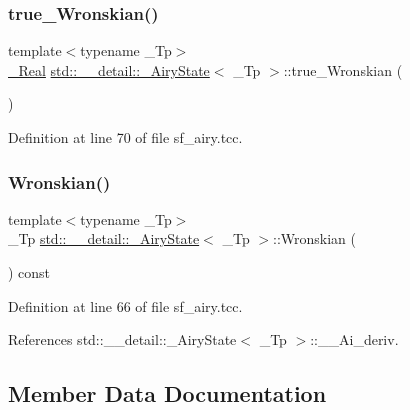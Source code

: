 \subsubsection{\texorpdfstring{true\+\_\+\+Wronskian()}{true\_Wronskian()}}
{\footnotesize\ttfamily template$<$typename \+\_\+\+Tp$>$ \\
\hyperlink{structstd_1_1____detail_1_1__AiryState_a8fc5c7c19e6dd8f25f1e4103f74c0a3b}{\+\_\+\+Real} \hyperlink{structstd_1_1____detail_1_1__AiryState}{std\+::\+\_\+\+\_\+detail\+::\+\_\+\+Airy\+State}$<$ \+\_\+\+Tp $>$\+::true\+\_\+\+Wronskian (\begin{DoxyParamCaption}{ }\end{DoxyParamCaption})\hspace{0.3cm}{\ttfamily [inline]}}



Definition at line 70 of file sf\+\_\+airy.\+tcc.

\mbox{\label{structstd_1_1____detail_1_1__AiryState_a565f891531681d918aa85320ad776428}} 
\subsubsection{\texorpdfstring{Wronskian()}{Wronskian()}}
{\footnotesize\ttfamily template$<$typename \+\_\+\+Tp$>$ \\
\+\_\+\+Tp \hyperlink{structstd_1_1____detail_1_1__AiryState}{std\+::\+\_\+\+\_\+detail\+::\+\_\+\+Airy\+State}$<$ \+\_\+\+Tp $>$\+::Wronskian (\begin{DoxyParamCaption}{ }\end{DoxyParamCaption}) const\hspace{0.3cm}{\ttfamily [inline]}}



Definition at line 66 of file sf\+\_\+airy.\+tcc.



References std\+::\+\_\+\+\_\+detail\+::\+\_\+\+Airy\+State$<$ \+\_\+\+Tp $>$\+::\+\_\+\+\_\+\+Ai\+\_\+deriv.



\subsection{Member Data Documentation}
\mbox{\label{structstd_1_1____detail_1_1__AiryState_a3d918b7b8cb09fd4bb57c10a5853c36f}} 
